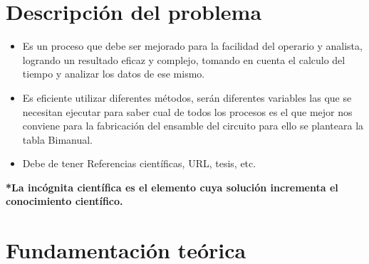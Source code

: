 \section{Descripción del problema}
\begin{itemize}
    \item Es un proceso que debe ser mejorado para la facilidad del operario y analista, logrando un resultado eficaz y complejo, tomando en cuenta el calculo del tiempo y analizar los datos de ese mismo.
    \item Es eficiente utilizar diferentes métodos, serán diferentes variables las que se necesitan ejecutar para saber cual de todos los procesos es el que mejor nos conviene para la fabricación del ensamble del circuito para ello se planteara la tabla Bimanual. 
    \item Debe de tener Referencias científicas, URL, tesis, etc.
\end{itemize}

\textbf{*La incógnita científica es el elemento cuya solución incrementa el conocimiento científico.}
% 
% 
\section{Fundamentación teórica}

